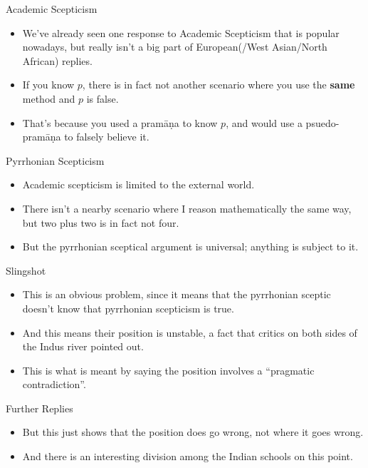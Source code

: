 \documentclass[
  17pt,
  letterpaper,
  ignorenonframetext,
  aspectratio=169,
  handout]{beamer}
\providecommand{\tightlist}{%
  \setlength{\itemsep}{0pt}\setlength{\parskip}{0pt}}\usepackage{longtable,booktabs,array}
\begin{document}
\begin{frame}{Academic Scepticism}
\protect\hypertarget{academic-scepticism-1}{}
\begin{itemize}[<+->]
\tightlist
\item
  We've already seen one response to Academic Scepticism that is popular
  nowadays, but really isn't a big part of European(/West Asian/North
  African) replies.
\item
  If you know \(p\), there is in fact not another scenario where you use
  the \textbf{same} method and \(p\) is false.
\item
  That's because you used a pramāṇa to know \(p\), and would use a
  psuedo-pramāṇa to falsely believe it.
\end{itemize}
\end{frame}

\begin{frame}{Pyrrhonian Scepticism}
\protect\hypertarget{pyrrhonian-scepticism-1}{}
\begin{itemize}[<+->]
\tightlist
\item
  Academic scepticism is limited to the external world.
\item
  There isn't a nearby scenario where I reason mathematically the same
  way, but two plus two is in fact not four.
\item
  But the pyrrhonian sceptical argument is universal; anything is
  subject to it.
\end{itemize}
\end{frame}

\begin{frame}{Slingshot}
\protect\hypertarget{slingshot}{}
\begin{itemize}[<+->]
\tightlist
\item
  This is an obvious problem, since it means that the pyrrhonian sceptic
  doesn't know that pyrrhonian scepticism is true.
\item
  And this means their position is unstable, a fact that critics on both
  sides of the Indus river pointed out.
\item
  This is what is meant by saying the position involves a ``pragmatic
  contradiction''.
\end{itemize}
\end{frame}

\begin{frame}{Further Replies}
\protect\hypertarget{further-replies}{}
\begin{itemize}[<+->]
\tightlist
\item
  But this just shows that the position does go wrong, not where it goes
  wrong.
\item
  And there is an interesting division among the Indian schools on this
  point.
\end{itemize}
\end{frame}
\end{document}

